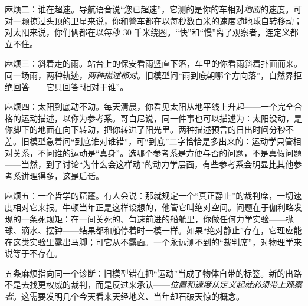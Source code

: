 麻烦二：谁在超速。导航语音说“您已超速”，它测的是你的车相对\emph{地面}的速度。可对一颗掠过头顶的卫星来说，你和警车都在以每秒数百米的速度随地球自转移动；对太阳来说，你们俩都在以每秒 30 千米绕圈。“快”和“慢”离了观察者，连定义都立不住。

麻烦三：斜着走的雨。站台上的保安看雨竖直下落，车里的你看雨斜着扑面而来。同一场雨，两种轨迹，\emph{两种描述都对}。旧模型问“雨到底朝哪个方向落”，自然界拒绝回答——它只回答“相对于谁”。

麻烦四：太阳到底动不动。每天清晨，你看见太阳从地平线上升起——一个完全合格的运动描述，以你为参考系。哥白尼说，同一件事也可以描述为：太阳没动，是你脚下的地面在向下转动，把你转进了阳光里。两种描述预言的日出时间分秒不差。旧模型急着问“到底谁对谁错”，可“到底”二字恰恰是多出来的：运动学只管相对关系，不问谁的运动是“真身”。选哪个参考系是方便与否的问题，不是真假问题——当然，到了讨论“为什么会这样动”的动力学层面，有些参考系会明显比其他参考系讲理得多，这是后话。

麻烦五：一个哲学的窟窿。有人会说：那就规定一个“真正静止”的裁判席，一切速度相对它来报。牛顿当年正是这样设想的，他管它叫绝对空间。问题在于伽利略发现的一条死规矩：在一间关死的、匀速前进的船舱里，你做任何力学实验——抛球、滴水、摆钟——结果都和船停着时一模一样。如果“绝对静止”存在，它理应能在这类实验里露出马脚；可它从不露面。一个永远测不到的“裁判席”，对物理学来说等于不存在。

五条麻烦指向同一个诊断：旧模型错在把“运动”当成了物体自带的标签。新的出路不是去找更权威的裁判，而是反过来承认——\emph{位置和速度从定义起就必须带上观察者}。这需要发明几个今天看来天经地义、当年却石破天惊的概念。

